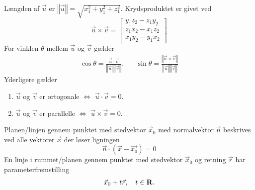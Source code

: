 Længden af $\vec{u}$ er $\left\Vert \vec{u}\right\Vert=\sqrt{x_1^2+y_1^2+z_1^2}$. Krydsproduktet er givet ved 
\begin{equation*}
    \vec{u}\times \vec{v}=\begin{bmatrix}
        y_1z_2-z_1y_2\\ z_1x_2-x_1z_2\\x_1y_2-y_1x_2
    \end{bmatrix}
\end{equation*}
For vinklen $\theta$ mellem $\vec{u}$ og $\vec{v}$ gælder 
\begin{align*}
    \cos\theta=\frac{\vec{u}\cdot\vec{v}}{\left\Vert \vec{u}\right\Vert \left\Vert \vec{v}\right\Vert }, && \sin\theta=\frac{\left\Vert \vec{u}\times \vec{v}\right\Vert }{\left\Vert \vec{u}\right\Vert \left\Vert \vec{v}\right\Vert}
\end{align*}
Yderligere gælder 
\begin{enumerate}
    \item $\vec{u}$ og $\vec{v}$ er ortogonale $\Leftrightarrow$ $\vec{u}\cdot\vec{v}=0$.
    \item $\vec{u}$ og $\vec{v}$ er parallelle $\Leftrightarrow$ $\vec{u}\times\vec{v}=0$.
\end{enumerate}
Planen/linjen gennem punktet med stedvektor $\vec{x}_0$ med normalvektor $\vec{n}$ beskrives ved alle vektorer $\vec{x}$ der løser ligningen
\begin{equation*}
    \vec{n}\cdot(\vec{x}-\vec{x_0})=0
\end{equation*}
En linje i rummet/planen gennem punktet med stedvektor $\vec{x}_0$ og retning $\vec{r}$ har parameterfremstilling
\begin{align*}
    \vec{x}_0+t\vec{r}, \quad t\in \mathbf{R}.
\end{align*}